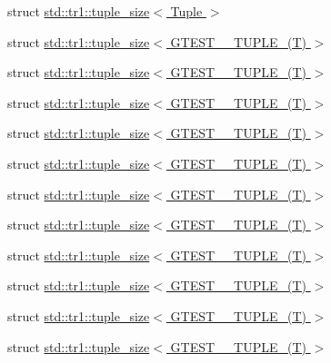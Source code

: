 \begin{DoxyCompactItemize}
\item 
struct \hyperlink{structstd_1_1tr1_1_1tuple__size}{std\+::tr1\+::tuple\+\_\+size$<$ Tuple $>$}
\item 
struct \hyperlink{structstd_1_1tr1_1_1tuple__size_3_01_g_t_e_s_t__0___t_u_p_l_e___07_t_08_01_4}{std\+::tr1\+::tuple\+\_\+size$<$ G\+T\+E\+S\+T\+\_\+\_\+\+T\+U\+P\+L\+E\+\_\+(\+T) $>$}
\item 
struct \hyperlink{structstd_1_1tr1_1_1tuple__size_3_01_g_t_e_s_t__1___t_u_p_l_e___07_t_08_01_4}{std\+::tr1\+::tuple\+\_\+size$<$ G\+T\+E\+S\+T\+\_\+\_\+\+T\+U\+P\+L\+E\+\_\+(\+T) $>$}
\item 
struct \hyperlink{structstd_1_1tr1_1_1tuple__size_3_01_g_t_e_s_t__2___t_u_p_l_e___07_t_08_01_4}{std\+::tr1\+::tuple\+\_\+size$<$ G\+T\+E\+S\+T\+\_\+\_\+\+T\+U\+P\+L\+E\+\_\+(\+T) $>$}
\item 
struct \hyperlink{structstd_1_1tr1_1_1tuple__size_3_01_g_t_e_s_t__3___t_u_p_l_e___07_t_08_01_4}{std\+::tr1\+::tuple\+\_\+size$<$ G\+T\+E\+S\+T\+\_\+\_\+\+T\+U\+P\+L\+E\+\_\+(\+T) $>$}
\item 
struct \hyperlink{structstd_1_1tr1_1_1tuple__size_3_01_g_t_e_s_t__4___t_u_p_l_e___07_t_08_01_4}{std\+::tr1\+::tuple\+\_\+size$<$ G\+T\+E\+S\+T\+\_\+\_\+\+T\+U\+P\+L\+E\+\_\+(\+T) $>$}
\item 
struct \hyperlink{structstd_1_1tr1_1_1tuple__size_3_01_g_t_e_s_t__5___t_u_p_l_e___07_t_08_01_4}{std\+::tr1\+::tuple\+\_\+size$<$ G\+T\+E\+S\+T\+\_\+\_\+\+T\+U\+P\+L\+E\+\_\+(\+T) $>$}
\item 
struct \hyperlink{structstd_1_1tr1_1_1tuple__size_3_01_g_t_e_s_t__6___t_u_p_l_e___07_t_08_01_4}{std\+::tr1\+::tuple\+\_\+size$<$ G\+T\+E\+S\+T\+\_\+\_\+\+T\+U\+P\+L\+E\+\_\+(\+T) $>$}
\item 
struct \hyperlink{structstd_1_1tr1_1_1tuple__size_3_01_g_t_e_s_t__7___t_u_p_l_e___07_t_08_01_4}{std\+::tr1\+::tuple\+\_\+size$<$ G\+T\+E\+S\+T\+\_\+\_\+\+T\+U\+P\+L\+E\+\_\+(\+T) $>$}
\item 
struct \hyperlink{structstd_1_1tr1_1_1tuple__size_3_01_g_t_e_s_t__8___t_u_p_l_e___07_t_08_01_4}{std\+::tr1\+::tuple\+\_\+size$<$ G\+T\+E\+S\+T\+\_\+\_\+\+T\+U\+P\+L\+E\+\_\+(\+T) $>$}
\item 
struct \hyperlink{structstd_1_1tr1_1_1tuple__size_3_01_g_t_e_s_t__9___t_u_p_l_e___07_t_08_01_4}{std\+::tr1\+::tuple\+\_\+size$<$ G\+T\+E\+S\+T\+\_\+\_\+\+T\+U\+P\+L\+E\+\_\+(\+T) $>$}
\item 
struct \hyperlink{structstd_1_1tr1_1_1tuple__size_3_01_g_t_e_s_t__10___t_u_p_l_e___07_t_08_01_4}{std\+::tr1\+::tuple\+\_\+size$<$ G\+T\+E\+S\+T\+\_\+\_\+\+T\+U\+P\+L\+E\+\_\+(\+T) $>$}

\end{DoxyCompactItemize}

